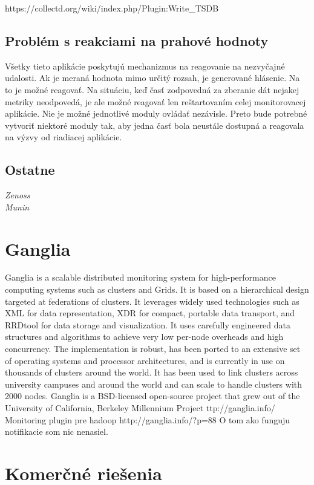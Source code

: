 \documentclass[11pt,final,oneside]{fithesis}
\begin{document}
https://collectd.org/wiki/index.php/Plugin:Write_TSDB

\subsection{Problém s reakciami na prahové hodnoty}
Všetky tieto aplikácie poskytujú mechanizmus na reagovanie na nezvyčajné udalosti. Ak je meraná hodnota mimo určitý rozsah, je generované hlásenie. Na to je možné reagovať.
Na situáciu, keď časť zodpovedná za zberanie dát nejakej metriky neodpovedá, je ale možné reagovať len reštartovaním celej monitorovacej aplikácie. 
Nie je možné jednotlivé moduly ovládať nezávisle. 
Preto bude potrebné vytvoriť niektoré moduly tak, aby jedna časť bola neustále dostupná a reagovala na výzvy od riadiacej aplikácie.

\subsection{Ostatne} 
\begin{description}
\item[\emph{Zenoss}]
\item[\emph{Munin}]
\end{description}

\section{Ganglia} 
Ganglia is a scalable distributed monitoring system for high-performance computing systems such as clusters and Grids. It is based on a hierarchical design targeted at federations of clusters. It leverages widely used technologies such as XML for data representation, XDR for compact, portable data transport, and RRDtool for data storage and visualization. It uses carefully engineered data structures and algorithms to achieve very low per-node overheads and high concurrency. The implementation is robust, has been ported to an extensive set of operating systems and processor architectures, and is currently in use on thousands of clusters around the world. It has been used to link clusters across university campuses and around the world and can scale to handle clusters with 2000 nodes.
Ganglia is a BSD-licensed open-source project that grew out of the University of California, Berkeley Millennium Project
ttp://ganglia.info/
Monitoring plugin pre hadoop
http://ganglia.info/?p=88
O tom ako funguju notifikacie som nic nenasiel.

\section{Komerčné riešenia}
\end{document}
